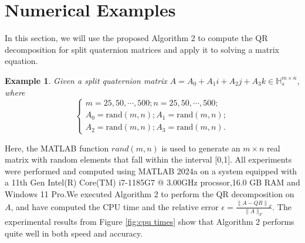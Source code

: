 \documentclass[5p]{elsarticle}
\newtheorem{example}[theorem]{Example}
\numberwithin{equation}{section}
\begin{document}
\section{Numerical Examples}
In this section,  we will use the proposed  Algorithm 2 to compute the QR decomposition for split quaternion matrices and apply it to solving a matrix equation.
\begin{example}
    Given a split quaternion matrix $A = A_{0}+A_{1}i+A_{2}j+A_{3}k\in \mathbb{H}_s^{m\times n}$, where
    \begin{equation}
       \begin{cases}
            m = 25,50,\cdots,500;
            n = 25,50,\cdots,500;  \\
            A_{0}=\text{rand}(m,n);
            A_{1}=\text{rand}(m,n); \\
            A_{2}=\text{rand}(m,n);
            A_{3}=\text{rand}(m,n).
        \end{cases} \label{eq:example2}
    \end{equation}
\end{example}
Here, the MATLAB function  $rand(m,n)$ is used to generate an $m \times n$ real matrix with random elements that fall within the interval [0,1]. All experiments were performed and computed using MATLAB 2024a on a system equipped with a 11th Gen Intel(R) Core(TM) i7-1185G7 @ 3.00GHz procssor,16.0 GB RAM and Windows 11 Pro.We executed Algorithm 2 to perform the QR decomposition on $A$, and have computed the CPU time and the relative error
$\epsilon = \frac{\left\|A - Q R\right\|_{F}}{\|A\|_{F}}.$
The experimental results from Figure \ref{fig:cpu times} show that Algorithm 2 performs quite well in both speed and accuracy. 
\end{document}
